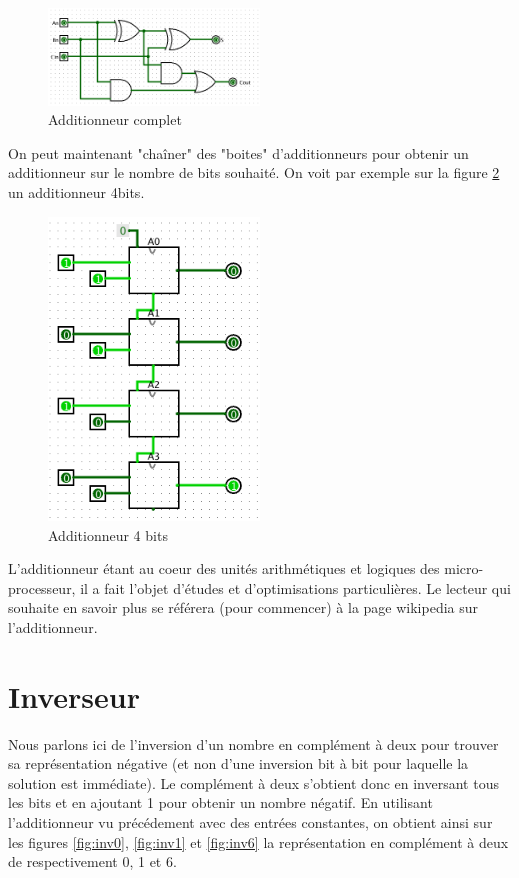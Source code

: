 \documentclass{book}
\theoremstyle{definition}
\theoremstyle{definition}
\begin{document}
\begin{figure}
\includegraphics[width=0.5\textwidth]{media/SysLogiques/Add.png}
    \centering
    \caption{Additionneur complet}
    \label{fig:add}
\end{figure}

On peut maintenant "chaîner" des "boites" d'additionneurs pour obtenir un additionneur sur le nombre de bits souhaité. On voit par exemple sur la figure \ref{fig:add4bit} un additionneur 4bits.

\begin{figure}
\includegraphics[width=0.5\textwidth]{media/SysLogiques/add4bit.png}
    \centering
    \caption{Additionneur 4 bits}
    \label{fig:add4bit}
\end{figure}

L'additionneur étant au coeur des unités arithmétiques et logiques des micro-processeur, il a fait l'objet d'études et d'optimisations particulières. Le lecteur qui souhaite en savoir plus se référera (pour commencer) à la page wikipedia sur l'additionneur.
\section{Inverseur}
Nous parlons ici de l'inversion d'un nombre en complément à deux pour trouver sa représentation négative (et non d'une inversion bit à bit pour laquelle la solution est immédiate).
Le complément à deux s'obtient donc en inversant tous les bits et en ajoutant 1 pour obtenir un nombre négatif.
En utilisant l'additionneur vu précédement avec des entrées constantes, on obtient ainsi sur les figures \ref{fig:inv0}, \ref{fig:inv1} et \ref{fig:inv6} la représentation en complément à deux de respectivement 0, 1 et 6.
\end{document}
